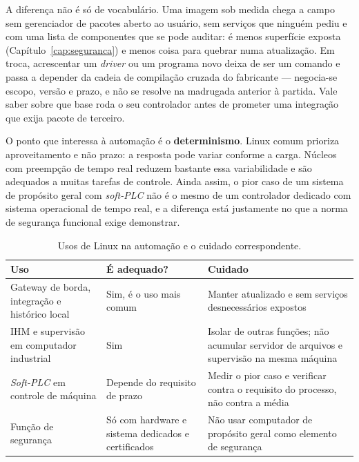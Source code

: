 A diferença não é só de vocabulário. Uma imagem sob medida chega a campo sem gerenciador de pacotes
aberto ao usuário, sem serviços que ninguém pediu e com uma lista de componentes que se pode
auditar: é menos superfície exposta (Capítulo~\ref{cap:seguranca}) e menos coisa para quebrar numa
atualização. Em troca, acrescentar um \emph{driver} ou um programa novo deixa de ser um comando e
passa a depender da cadeia de compilação cruzada do fabricante --- negocia-se escopo, versão e
prazo, e não se resolve na madrugada anterior à partida. Vale saber sobre que base roda o seu
controlador antes de prometer uma integração que exija pacote de terceiro.

O ponto que interessa à automação é o \textbf{determinismo}. Linux comum prioriza aproveitamento e
não prazo: a resposta pode variar conforme a carga. Núcleos com preempção de tempo real reduzem
bastante essa variabilidade e são adequados a muitas tarefas de controle. Ainda assim, o pior caso
de um sistema de propósito geral com \emph{soft-PLC} não é o mesmo de um controlador dedicado com
sistema operacional de tempo real, e a diferença está justamente no que a norma de segurança
funcional exige demonstrar.

\begin{table}[H]
  \centering
  \caption{Usos de Linux na automação e o cuidado correspondente.}
  \label{tab:linux-uso}
  \begin{tabular}{p{4.6cm} p{4.2cm} p{5.5cm}}
    \toprule
    Uso & É adequado? & Cuidado \\
    \midrule
    Gateway de borda, integração e histórico local
      & Sim, é o uso mais comum
      & Manter atualizado e sem serviços desnecessários expostos \\
    \addlinespace
    IHM e supervisão em computador industrial
      & Sim
      & Isolar de outras funções; não acumular servidor de arquivos e supervisão na mesma máquina \\
    \addlinespace
    \emph{Soft-PLC} em controle de máquina
      & Depende do requisito de prazo
      & Medir o pior caso e verificar contra o requisito do processo, não contra a média \\
    \addlinespace
    Função de segurança
      & Só com hardware e sistema dedicados e certificados
      & Não usar computador de propósito geral como elemento de segurança \\
    \bottomrule
  \end{tabular}
\end{table}

